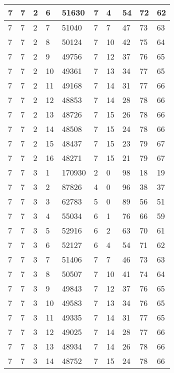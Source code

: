 \begin{table}[!ht]
\begin{tabular}{|l|l|l|l|l|l|l|l|l|l|}
        7 & 7 & 2 & 6 & 51630 & 7 & 4 & 54 & 72 & 62 \\ \hline
        7 & 7 & 2 & 7 & 51040 & 7 & 7 & 47 & 73 & 63 \\ \hline
        7 & 7 & 2 & 8 & 50124 & 7 & 10 & 42 & 75 & 64 \\ \hline
        7 & 7 & 2 & 9 & 49756 & 7 & 12 & 37 & 76 & 65 \\ \hline
        7 & 7 & 2 & 10 & 49361 & 7 & 13 & 34 & 77 & 65 \\ \hline
        7 & 7 & 2 & 11 & 49168 & 7 & 14 & 31 & 77 & 66 \\ \hline
        7 & 7 & 2 & 12 & 48853 & 7 & 14 & 28 & 78 & 66 \\ \hline
        7 & 7 & 2 & 13 & 48726 & 7 & 15 & 26 & 78 & 66 \\ \hline
        7 & 7 & 2 & 14 & 48508 & 7 & 15 & 24 & 78 & 66 \\ \hline
        7 & 7 & 2 & 15 & 48437 & 7 & 15 & 23 & 79 & 67 \\ \hline
        7 & 7 & 2 & 16 & 48271 & 7 & 15 & 21 & 79 & 67 \\ \hline
        7 & 7 & 3 & 1 & 170930 & 2 & 0 & 98 & 18 & 19 \\ \hline
        7 & 7 & 3 & 2 & 87826 & 4 & 0 & 96 & 38 & 37 \\ \hline
        7 & 7 & 3 & 3 & 62783 & 5 & 0 & 89 & 56 & 51 \\ \hline
        7 & 7 & 3 & 4 & 55034 & 6 & 1 & 76 & 66 & 59 \\ \hline
        7 & 7 & 3 & 5 & 52916 & 6 & 2 & 63 & 70 & 61 \\ \hline
        7 & 7 & 3 & 6 & 52127 & 6 & 4 & 54 & 71 & 62 \\ \hline
        7 & 7 & 3 & 7 & 51406 & 7 & 7 & 46 & 73 & 63 \\ \hline
        7 & 7 & 3 & 8 & 50507 & 7 & 10 & 41 & 74 & 64 \\ \hline
        7 & 7 & 3 & 9 & 49843 & 7 & 12 & 37 & 76 & 65 \\ \hline
        7 & 7 & 3 & 10 & 49583 & 7 & 13 & 34 & 76 & 65 \\ \hline
        7 & 7 & 3 & 11 & 49335 & 7 & 14 & 31 & 77 & 65 \\ \hline
        7 & 7 & 3 & 12 & 49025 & 7 & 14 & 28 & 77 & 66 \\ \hline
        7 & 7 & 3 & 13 & 48934 & 7 & 14 & 26 & 78 & 66 \\ \hline
        7 & 7 & 3 & 14 & 48752 & 7 & 15 & 24 & 78 & 66 \\ \hline

\end{tabular}
\end{table}
